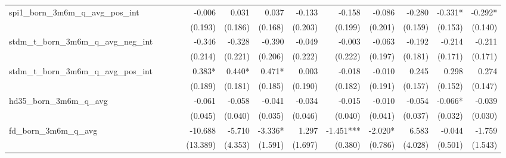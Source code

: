 \begin{tabular}{lrrrrrrrrrrrr}
spi1\_born\_3m6m\_q\_avg\_pos\_int          &              &              &              &       -0.006 &        0.031 &        0.037 &       -0.133 &       -0.158 &       -0.086 &       -0.280 &      -0.331* &      -0.292* \\ 
                                            &              &              &              &      (0.193) &      (0.186) &      (0.168) &      (0.203) &      (0.199) &      (0.201) &      (0.159) &      (0.153) &      (0.140) \\ 
stdm\_t\_born\_3m6m\_q\_avg\_neg\_int       &              &              &              &       -0.346 &       -0.328 &       -0.390 &       -0.049 &       -0.003 &       -0.063 &       -0.192 &       -0.214 &       -0.211 \\ 
                                            &              &              &              &      (0.214) &      (0.221) &      (0.206) &      (0.222) &      (0.222) &      (0.197) &      (0.181) &      (0.171) &      (0.171) \\ 
stdm\_t\_born\_3m6m\_q\_avg\_pos\_int       &              &              &              &       0.383* &       0.440* &       0.471* &        0.003 &       -0.018 &       -0.010 &        0.245 &        0.298 &        0.274 \\ 
                                            &              &              &              &      (0.189) &      (0.181) &      (0.185) &      (0.190) &      (0.182) &      (0.191) &      (0.157) &      (0.152) &      (0.147) \\ 
hd35\_born\_3m6m\_q\_avg                    &              &              &              &       -0.061 &       -0.058 &       -0.041 &       -0.034 &       -0.015 &       -0.010 &       -0.054 &      -0.066* &       -0.039 \\ 
                                            &              &              &              &      (0.045) &      (0.040) &      (0.035) &      (0.046) &      (0.040) &      (0.041) &      (0.037) &      (0.032) &      (0.030) \\ 
fd\_born\_3m6m\_q\_avg                      &              &              &              &      -10.688 &       -5.710 &      -3.336* &        1.297 &    -1.451*** &      -2.020* &        6.583 &       -0.044 &       -1.759 \\ 
                                            &              &              &              &     (13.389) &      (4.353) &      (1.591) &      (1.697) &      (0.380) &      (0.786) &      (4.028) &      (0.501) &      (1.543) \\ 

\end{tabular}
